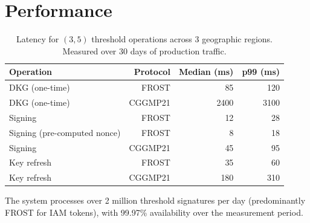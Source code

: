 \section{Performance}

\label{sec:performance}

\begin{table}[H]
\centering
\small
\begin{tabular}{lrrr}
\toprule
\textbf{Operation} & \textbf{Protocol} & \textbf{Median (ms)} & \textbf{p99 (ms)} \\
\midrule
DKG (one-time) & FROST & 85 & 120 \\
DKG (one-time) & CGGMP21 & 2400 & 3100 \\
Signing & FROST & 12 & 28 \\
Signing (pre-computed nonce) & FROST & 8 & 18 \\
Signing & CGGMP21 & 45 & 95 \\
Key refresh & FROST & 35 & 60 \\
Key refresh & CGGMP21 & 180 & 310 \\
\bottomrule
\end{tabular}
\caption{Latency for $(3, 5)$ threshold operations across 3 geographic regions.
Measured over 30 days of production traffic.}
\label{tab:perf}
\end{table}

The system processes over 2 million threshold signatures per day (predominantly
FROST for IAM tokens), with 99.97\% availability over the measurement period.

